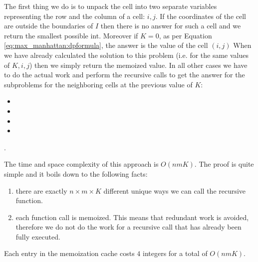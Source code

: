 The first thing we do is to unpack the cell into two separate variables representing the row and the
column of a cell: $i,j$. If the coordinates of the cell are outside the boundaries of $I$ then there
is no answer for such a cell and we return the smallest possible int. Moreover if $K=0$, as per
Equation \ref{eq:max_manhattan:dpformula}, the answer is the value of the cell $(i,j)$ When we have
already calculated the solution to this problem (i.e. for the same values of $K,i,j$) then we
simply return the memoized value. In all  other cases we have to do the actual work and perform
the recursive calls to get the answer for the subproblems for the neighboring cells at the previous
value of $K$:
\begin{itemize}
    \item {}
    \item {}
    \item {}
    \item {} \end{itemize}.

The time and space complexity of this approach is $O(nmK)$. The proof is quite simple and it boils
down to the following facts:
\begin{enumerate}
    \item there are exactly $n\times m \times K$ different unique ways we can call the recursive
    function.
    \item each function call is memoized. This means that redundant work is avoided, therefore we do
    not do the work for a recursive call that has already been fully executed.
\end{enumerate}
Each entry in the memoization cache costs $4$ integers for a total of $O(nmK)$.





